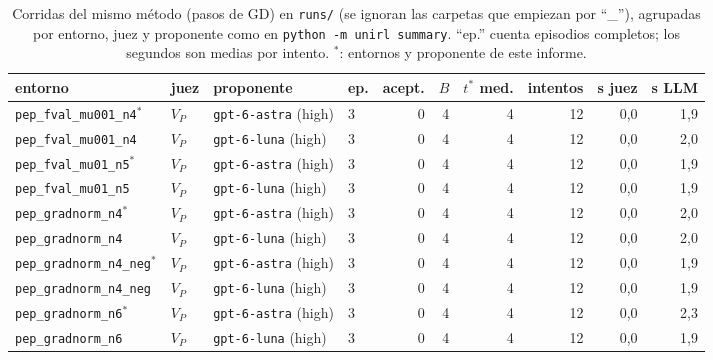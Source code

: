 \documentclass[11pt,a4paper]{article}
\begin{document}
\begin{table}[!ht]
\centering
\scriptsize
\begin{tabular}{@{}llllrrrrrr@{}}
\toprule
entorno & juez & proponente & ep. & acept. & $B$ & $t^*$ med. & intentos & s juez & s LLM \\
\midrule
\texttt{pep\_\allowbreak{}fval\_\allowbreak{}mu001\_\allowbreak{}n4}$^\ast$ & $V_P$ & \texttt{gpt-\allowbreak{}6-\allowbreak{}astra} (high) & 3 & 0 & 4 & 4 & 12 & 0{,}0 & 1{,}9 \\
\texttt{pep\_\allowbreak{}fval\_\allowbreak{}mu001\_\allowbreak{}n4} & $V_P$ & \texttt{gpt-\allowbreak{}6-\allowbreak{}luna} (high) & 3 & 0 & 4 & 4 & 12 & 0{,}0 & 2{,}0 \\
\texttt{pep\_\allowbreak{}fval\_\allowbreak{}mu01\_\allowbreak{}n5}$^\ast$ & $V_P$ & \texttt{gpt-\allowbreak{}6-\allowbreak{}astra} (high) & 3 & 0 & 4 & 4 & 12 & 0{,}0 & 1{,}9 \\
\texttt{pep\_\allowbreak{}fval\_\allowbreak{}mu01\_\allowbreak{}n5} & $V_P$ & \texttt{gpt-\allowbreak{}6-\allowbreak{}luna} (high) & 3 & 0 & 4 & 4 & 12 & 0{,}0 & 1{,}9 \\
\texttt{pep\_\allowbreak{}gradnorm\_\allowbreak{}n4}$^\ast$ & $V_P$ & \texttt{gpt-\allowbreak{}6-\allowbreak{}astra} (high) & 3 & 0 & 4 & 4 & 12 & 0{,}0 & 2{,}0 \\
\texttt{pep\_\allowbreak{}gradnorm\_\allowbreak{}n4} & $V_P$ & \texttt{gpt-\allowbreak{}6-\allowbreak{}luna} (high) & 3 & 0 & 4 & 4 & 12 & 0{,}0 & 2{,}0 \\
\texttt{pep\_\allowbreak{}gradnorm\_\allowbreak{}n4\_\allowbreak{}neg}$^\ast$ & $V_P$ & \texttt{gpt-\allowbreak{}6-\allowbreak{}astra} (high) & 3 & 0 & 4 & 4 & 12 & 0{,}0 & 1{,}9 \\
\texttt{pep\_\allowbreak{}gradnorm\_\allowbreak{}n4\_\allowbreak{}neg} & $V_P$ & \texttt{gpt-\allowbreak{}6-\allowbreak{}luna} (high) & 3 & 0 & 4 & 4 & 12 & 0{,}0 & 1{,}9 \\
\texttt{pep\_\allowbreak{}gradnorm\_\allowbreak{}n6}$^\ast$ & $V_P$ & \texttt{gpt-\allowbreak{}6-\allowbreak{}astra} (high) & 3 & 0 & 4 & 4 & 12 & 0{,}0 & 2{,}3 \\
\texttt{pep\_\allowbreak{}gradnorm\_\allowbreak{}n6} & $V_P$ & \texttt{gpt-\allowbreak{}6-\allowbreak{}luna} (high) & 3 & 0 & 4 & 4 & 12 & 0{,}0 & 1{,}9 \\
\bottomrule
\end{tabular}
\caption{Corridas del mismo método (pasos de GD) en \texttt{runs/} (se ignoran las carpetas que empiezan por ``\_''), agrupadas por entorno, juez y proponente como en \texttt{python -m unirl summary}. ``ep.'' cuenta episodios completos; los segundos son medias por intento. $^\ast$: entornos y proponente de este informe.}
\label{tab:comparacion}
\end{table}
\end{document}
